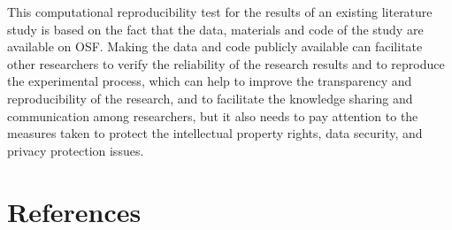 \documentclass[
  man,floatsintext]{apa6}
\begin{document}
This computational reproducibility test for the results of an existing literature study is based on the fact that the data, materials and code of the study are available on OSF. Making the data and code publicly available can facilitate other researchers to verify the reliability of the research results and to reproduce the experimental process, which can help to improve the transparency and reproducibility of the research, and to facilitate the knowledge sharing and communication among researchers, but it also needs to pay attention to the measures taken to protect the intellectual property rights, data security, and privacy protection issues.

\newpage

\section{References}\label{references}
\end{document}
